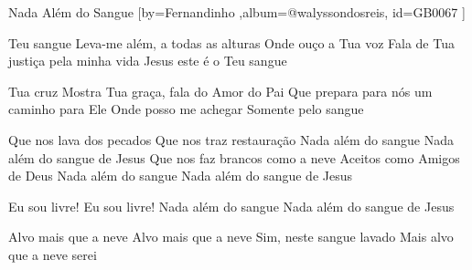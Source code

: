 \beginsong
{Nada Além do Sangue %
}[by={Fernandinho  %
},album={@walyssondosreis},
id={GB0067 %
}] 

\beginverse* 
Teu sangue
Leva-me além, a todas as alturas
Onde ouço a Tua voz
Fala de Tua justiça pela minha vida
Jesus este é o Teu sangue
\endverse

\beginverse* 
Tua cruz
Mostra Tua graça, fala do Amor do Pai
Que prepara para nós um caminho para Ele
Onde posso me achegar
Somente pelo sangue
\endverse

\beginchorus 
Que nos lava dos pecados
Que nos traz restauração
Nada além do sangue
Nada além do sangue de Jesus
Que nos faz brancos como a neve
Aceitos como Amigos de Deus
Nada além do sangue
Nada além do sangue de Jesus
\endchorus

\beginverse* 
Eu sou livre!
Eu sou livre!
Nada além do sangue
Nada além do sangue de Jesus
\endverse

\beginverse* 
Alvo mais que a neve
Alvo mais que a neve
Sim, neste sangue lavado
Mais alvo que a neve serei
\endverse

\begin{comment}
\lstset{basicstyle=\scriptsize\bf} %
\tab{Solo 1}
\begin{lstlisting}
E|-----------------------------------------------------|
B|-----------------------------------------------------|
G|-----------------------------------------------------|
D|-----------------------------------------------------|
A|-----------------------------------------------------|
E|-----------------------------------------------------|
\end{lstlisting}
\end{comment}
\vspace{2em}
%
%
% 
% 
\endsong
\begin{comment}

\end{comment}